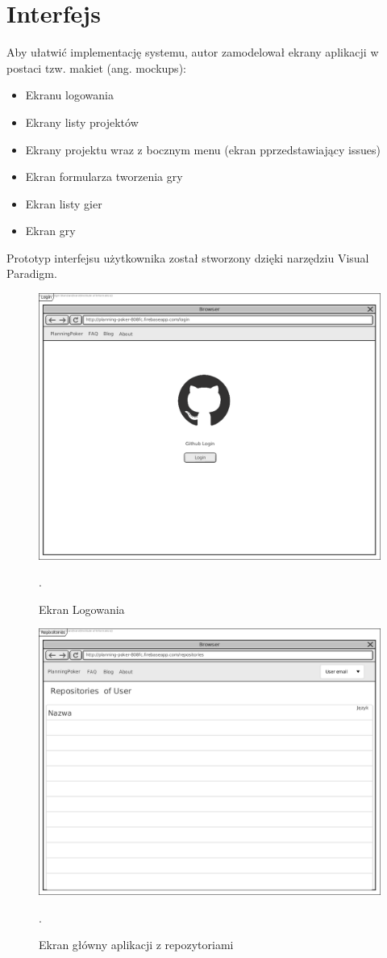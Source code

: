 \section{Interfejs}
Aby ułatwić implementację systemu, autor zamodelował ekrany aplikacji w postaci
tzw. makiet (ang. mockups):
\begin{itemize}
    \item Ekranu logowania
    \item Ekrany listy projektów
    \item Ekrany projektu wraz z bocznym menu (ekran pprzedstawiający issues)
    \item Ekran formularza tworzenia gry
    \item Ekran listy gier
    \item Ekran gry
\end{itemize}
Prototyp interfejsu użytkownika został stworzony dzięki narzędziu Visual Paradigm.
\begin{figure}[H]
	\centering\includegraphics[width=.7\textwidth]{img/LoginScreen}
	\caption{Ekran Logowania}.
	\label{rys:loginScreen}
\end{figure}
\begin{figure}[H]
	\centering\includegraphics[width=.7\textwidth]{img/RepositoriesScreen}
	\caption{Ekran główny aplikacji z repozytoriami}.
	\label{rys:RepositoriesScreen}
\end{figure}

